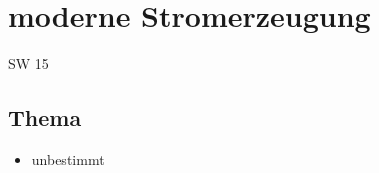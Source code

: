 \section{moderne Stromerzeugung}{SW 15}

\subsection{Thema}

\begin{itemize}
	\item unbestimmt
\end{itemize}